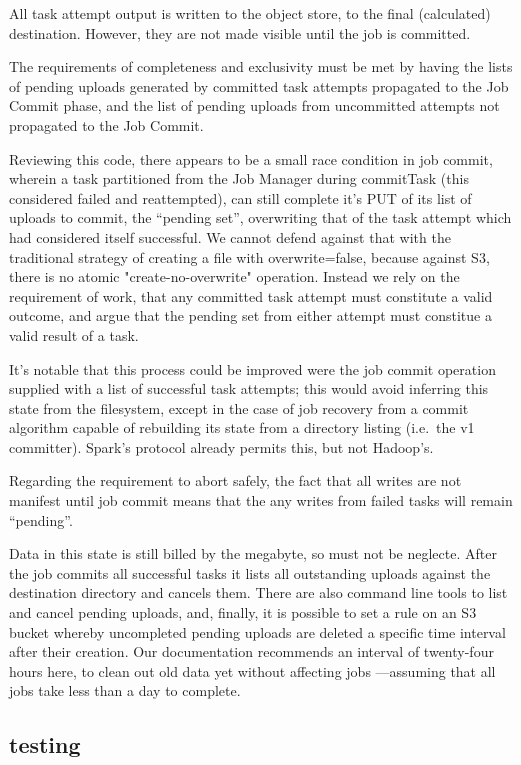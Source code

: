 \documentclass[conference]{IEEEtran}
\begin{document}
All task attempt output is written to the object store, to the final (calculated)
destination.
However, they are not made visible until the job is committed.

The requirements of completeness and exclusivity must be met by
having the lists of pending uploads generated by committed task attempts propagated
to the Job Commit phase, and the list of pending uploads from uncommitted
attempts not propagated to the Job Commit.


Reviewing this code, there appears to be a small race condition in job commit,
wherein a task partitioned from the Job Manager during commitTask
(this considered failed and reattempted),
can still complete it's PUT of its list of uploads to commit, the ``pending set'',
overwriting that of the task attempt which had considered itself successful.
We cannot defend against that with the traditional strategy of creating
a file with overwrite=false, because against S3, there is no atomic
"create-no-overwrite" operation.
Instead we rely on the requirement of work, that any committed task attempt must
constitute a valid outcome, and argue that the pending set from either attempt
must constitue a valid result of a task.

It's notable that this process could be improved were the job commit
operation supplied with a list of successful task attempts;
this would avoid inferring this state from the filesystem, except in
the case of job recovery from a commit algorithm capable of
rebuilding its state from a directory listing (i.e.\ the v1 committer).
Spark's protocol already permits this, but not Hadoop's.

Regarding the requirement to abort safely, the fact that all writes are
not manifest until job commit means that the any writes from failed tasks
will remain ``pending''.

Data in this state is still billed by the megabyte, so must not be neglecte.
After the job commits all successful tasks it lists all outstanding
uploads against the destination directory and cancels them.
There are also command line tools to list and cancel pending uploads,
and, finally, it is possible to set a rule on an S3 bucket whereby uncompleted
pending uploads are deleted a specific time interval after their creation.
Our documentation recommends an interval of twenty-four hours here, to
clean out old data yet without affecting jobs ---assuming that all jobs
take less than a day to complete.


\subsection{testing}\label{subsec:testing}
\end{document}
